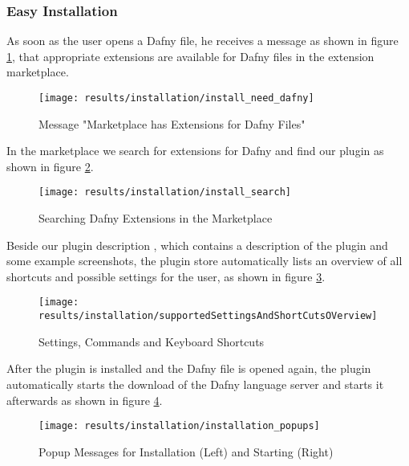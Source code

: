 \subsubsection{Easy Installation}
As soon as the user opens a Dafny file, he receives a message as shown in figure \ref{fig:install_need_dafny},
that appropriate extensions are available for Dafny files in the extension marketplace.

\begin{figure}[H]
    \centering
    \texttt{[image: results/installation/install\_need\_dafny]}
    \caption{Message "Marketplace has Extensions for Dafny Files"}
    \label{fig:install_need_dafny}
\end{figure}

In the marketplace we search for extensions for Dafny and find our plugin as shown in figure \ref{fig:install_search}.

\begin{figure}[H]
    \centering
    \texttt{[image: results/installation/install\_search]}
    \caption{Searching Dafny Extensions in the Marketplace}
    \label{fig:install_search}
\end{figure}

Beside our plugin description \cite{our-dafny-plugin},
which contains a description of the plugin and some example screenshots,
the plugin store automatically lists an overview of all shortcuts and possible settings for the user,
as shown in figure \ref{fig:supportedSettingsAndShortCutsOVerview}.

\begin{figure}[H]
    \centering
    \texttt{[image: results/installation/supportedSettingsAndShortCutsOVerview]}
    \caption{Settings, Commands and Keyboard Shortcuts}
    \label{fig:supportedSettingsAndShortCutsOVerview}
\end{figure}

After the plugin is installed and the Dafny file is opened again,
the plugin automatically starts the download of the Dafny language server and
starts it afterwards as shown in figure \ref{fig:installation_popups}.

\begin{figure}[H]
    \centering
    \texttt{[image: results/installation/installation\_popups]}
    \caption{Popup Messages for Installation (Left) and Starting (Right)}
    \label{fig:installation_popups}
\end{figure}


